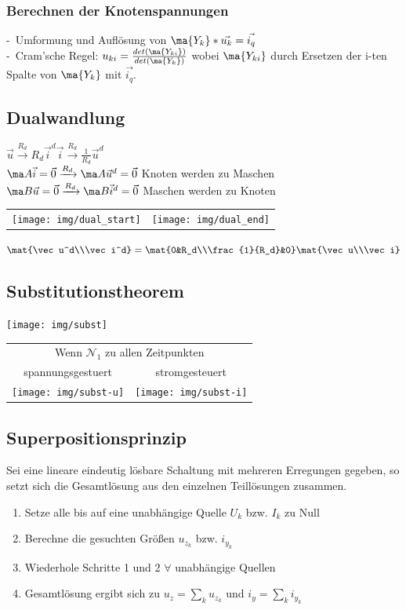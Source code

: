 \documentclass[fs, footer]{latex4ei}
\begin{document}
\begin{multicols*}{4}
    \subsubsection{Berechnen der Knotenspannungen}
    -\ Umformung und Auflösung von $\ma {Y_k} * \vec{u_k} = \vec{i_q}$\\
    -\ Cram'sche Regel: $u_{ki} = \frac{det(\ma {Y_{ki}})}{det(\ma{Y_k})}$ wobei $\ma {Y_{ki}}$ durch Ersetzen der i-ten Spalte von $\ma {Y_k}$ mit $\vec{i_q}$.\\

    \subsection{Dualwandlung}
    $\vec u \xrightarrow{R_d} R_d\vec i^d$\qquad$\vec i \xrightarrow{R_d} \frac{1}{R_d}\vec u^d$\\
    $\ma A\vec i = \vec 0 \xrightarrow{R_d} \ma A\vec u^d = \vec 0$ Knoten werden zu Maschen\\
    $\ma B\vec u = \vec 0 \xrightarrow{R_d} \ma B\vec i^d = \vec 0$ Maschen werden zu Knoten\\
    \begin{tabular}{cc}
        \texttt{[image: img/dual\_start]} &
        \texttt{[image: img/dual\_end]}
    \end{tabular}
    $\mat{\vec u^d\\\vec i^d}=\mat{0&R_d\\\frac{1}{R_d}&0}\mat{\vec u\\\vec i}$

    \subsection{Substitutionstheorem}
    \texttt{[image: img/subst]}\\
    \begin{tabular}{cc}
        \multicolumn{2}{c}{Wenn $\mathcal N_1$ zu allen Zeitpunkten} \\
        spannungsgestuert                        & stromgesteuert    \\
        \texttt{[image: img/subst-u]} &
        \texttt{[image: img/subst-i]}
    \end{tabular}

    \subsection{Superpositionsprinzip}
    Sei eine lineare eindeutig lösbare Schaltung mit mehreren Erregungen gegeben, so setzt sich die Gesamtlösung aus den einzelnen Teillösungen zusammen.
    \begin{enumerate}\itemsep0pt
        \item Setze alle bis auf eine unabhängige Quelle $U_k$ bzw. $I_k$ zu Null
        \item Berechne die gesuchten Größen $u_{z_k}$ bzw. $i_{y_k}$
        \item Wiederhole Schritte 1 und 2 $\forall$ unabhängige Quellen
        \item Gesamtlösung ergibt sich zu $u_z = \sum_ku_{z_k}$ und $i_y = \sum_ki_{y_k}$
    \end{enumerate}


\end{multicols*}
\end{document}
